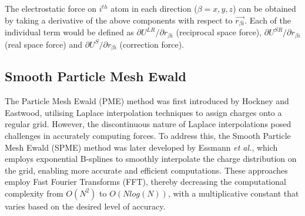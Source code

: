 The electrostatic force on $i^{th}$ atom in each direction ($\beta = x,y,z$) can be obtained by taking a derivative of the above components with respect to $\vec{r_{\beta i}}$. Each of the individual term would be defined as $\partial U^{LR}/\partial  r_{\beta i}$ (reciprocal space force), $\partial U^{SR}/\partial r_{\beta i}$ (real space force) and $\partial U^{S}/\partial r_{\beta i}$ (correction force).

\subsection{Smooth Particle Mesh Ewald}
The Particle Mesh Ewald (PME) method was first introduced by Hockney and Eastwood, utilising Laplace interpolation techniques to assign charges onto a regular grid. However, the discontinuous nature of Laplace interpolations posed challenges in accurately computing forces. To address this, the Smooth Particle Mesh Ewald (SPME) method was later developed by Essmann\textit{ et al.}, which employs exponential B-splines to smoothly interpolate the charge distribution on the grid, enabling more accurate and efficient computations. These approaches employ Fast Fourier Transforms (FFT), thereby decreasing the computational complexity from $O(N^2)$ to $O(Nlog(N))$, with a multiplicative constant that varies based on the desired level of accuracy.

